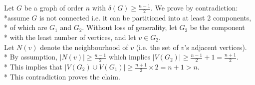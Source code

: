 Let $G$ be a graph of order $n$ with $\delta \left(G\right) \geq \frac{n-1}{2}$. We prove by contradiction:\\*assume $G$ is not connected i.e. it can be partitioned into at least 2 components,\\* of which are $G_1$ and $G_2$. Without loss of generality, let $G_2$ be the component\\* with the least number of vertices, and let $v \in G_2$.\\ Let $N\left(v\right)$ denote the neighbourhood of $v$ (i.e. the set of $v$'s adjacent vertices).\\* By assumption, $|N\left(v\right)| \geq \frac{n-1}{2}$ which implies $|V\left(G_2\right)| \geq \frac{n-1}{2} + 1 = \frac{n+1}{2}$.\\* This implies that $|V\left(G_2\right) \cup V\left(G_1\right)| \geq \frac{n+1}{2} \times 2 = n+1 > n$.\\* This contradiction proves the claim.
